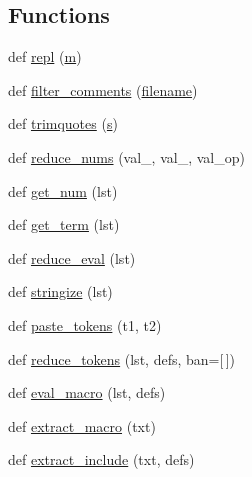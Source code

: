 \subsection*{Functions}
\begin{DoxyCompactItemize}
\item 
def \hyperlink{namespacewaflib_1_1_tools_1_1c__preproc_adca973b334d8f88d92fb16d2e3000874}{repl} (\hyperlink{layer3_8c_a4b8bfe70f28d6faddcb10d6ecf8c1989}{m})
\item 
def \hyperlink{namespacewaflib_1_1_tools_1_1c__preproc_a010e1e8b176d25dddad67e70e5c987bf}{filter\+\_\+comments} (\hyperlink{test__portburn_8cpp_a7efa5e9c7494c7d4586359300221aa5d}{filename})
\item 
def \hyperlink{namespacewaflib_1_1_tools_1_1c__preproc_abf61cd16ee0a918d873b4d37072168dd}{trimquotes} (\hyperlink{lib_2expat_8h_a755339d27872b13735c2cab829e47157}{s})
\item 
def \hyperlink{namespacewaflib_1_1_tools_1_1c__preproc_abec7f42c251d7b5e4cf212a1443b4952}{reduce\+\_\+nums} (val\+\_, val\+\_, val\+\_\+op)
\item 
def \hyperlink{namespacewaflib_1_1_tools_1_1c__preproc_a1e1d64d777ae7a4b10b8e6cf26c095c2}{get\+\_\+num} (lst)
\item 
def \hyperlink{namespacewaflib_1_1_tools_1_1c__preproc_a0871a7c3384ec9b371a2e10971221423}{get\+\_\+term} (lst)
\item 
def \hyperlink{namespacewaflib_1_1_tools_1_1c__preproc_adb7e6106ee0e6ef4d060264355319a4e}{reduce\+\_\+eval} (lst)
\item 
def \hyperlink{namespacewaflib_1_1_tools_1_1c__preproc_a81c768b64f09d0c576cc069a767cd114}{stringize} (lst)
\item 
def \hyperlink{namespacewaflib_1_1_tools_1_1c__preproc_a477752b5879e38da8d12a6e1499c2544}{paste\+\_\+tokens} (t1, t2)
\item 
def \hyperlink{namespacewaflib_1_1_tools_1_1c__preproc_a6de48629bec374961e7f95bb46b098d6}{reduce\+\_\+tokens} (lst, defs, ban=\mbox{[}$\,$\mbox{]})
\item 
def \hyperlink{namespacewaflib_1_1_tools_1_1c__preproc_a968a8591aff3c156e76348bdf1e3ce0c}{eval\+\_\+macro} (lst, defs)
\item 
def \hyperlink{namespacewaflib_1_1_tools_1_1c__preproc_ac4048079f0d423f3edbf0b405606a6bd}{extract\+\_\+macro} (txt)
\item 
def \hyperlink{namespacewaflib_1_1_tools_1_1c__preproc_ad928b7b6148c6578fd74deb15eb15a80}{extract\+\_\+include} (txt, defs)
\item 

\end{DoxyCompactItemize}
